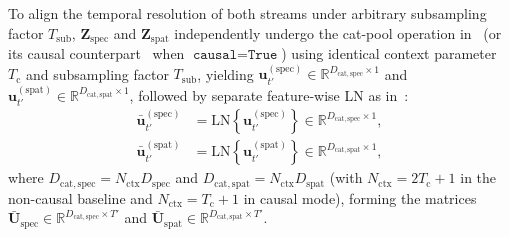 \documentclass[lettersize,journal]{IEEEtran}
\begin{document}
To align the temporal resolution of both streams under arbitrary subsampling factor $T_{\mathrm{sub}}$, $\mathbf{Z}_{\mathrm{spec}}$ and $\mathbf{Z}_{\mathrm{spat}}$ independently undergo the cat-pool operation in~ (or its causal counterpart~ when $\texttt{causal} = \texttt{True}$) using identical context parameter $T_{\mathrm{c}}$ and subsampling factor $T_{\mathrm{sub}}$, yielding $\mathbf{u}_{t'}^{(\mathrm{spec})} \in \mathbb{R}^{D_{\mathrm{cat,spec}} \times 1}$ and $\mathbf{u}_{t'}^{(\mathrm{spat})} \in \mathbb{R}^{D_{\mathrm{cat,spat}} \times 1}$, followed by separate feature-wise \gls{LN} as in~:
\begin{align}
  \bar{\mathbf{u}}_{t'}^{(\mathrm{spec})} &= \mathrm{LN}\!\left\{\mathbf{u}_{t'}^{(\mathrm{spec})}\right\} \in \mathbb{R}^{D_{\mathrm{cat,spec}} \times 1}, \label{eq:ln_spec_stream} \\
  \bar{\mathbf{u}}_{t'}^{(\mathrm{spat})} &= \mathrm{LN}\!\left\{\mathbf{u}_{t'}^{(\mathrm{spat})}\right\} \in \mathbb{R}^{D_{\mathrm{cat,spat}} \times 1}, \label{eq:ln_spat_stream}
\end{align}
where $D_{\mathrm{cat,spec}} = N_{\mathrm{ctx}} D_{\mathrm{spec}}$ and $D_{\mathrm{cat,spat}} = N_{\mathrm{ctx}} D_{\mathrm{spat}}$ (with $N_{\mathrm{ctx}} = 2T_{\mathrm{c}} + 1$ in the non-causal baseline and $N_{\mathrm{ctx}} = T_{\mathrm{c}} + 1$ in causal mode), forming the matrices $\bar{\mathbf{U}}_{\mathrm{spec}} \in \mathbb{R}^{D_{\mathrm{cat,spec}} \times T'}$ and $\bar{\mathbf{U}}_{\mathrm{spat}} \in \mathbb{R}^{D_{\mathrm{cat,spat}} \times T'}$.
\end{document}
